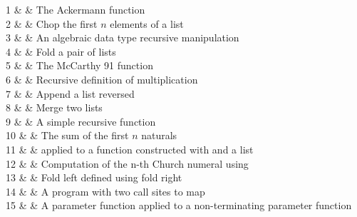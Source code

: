 1
& 
& The Ackermann function
\\ %

2
& 
& Chop the first $n$ elements of a list
\\ %

3
& 
&  An algebraic data type recursive  manipulation
\\ %

4
&  \hobenchmark
& Fold a pair of lists
\\ %

5
& 
& The McCarthy 91 function
\\ %

6
& 
& Recursive definition of multiplication
\\ %

7
& 
& Append a list reversed
\\ %

8
& 
& Merge two lists
\\ %

9
& 
& A simple recursive function
\\ %

10
& 
& The sum of the first $n$ naturals
\\ %


11
&  \hobenchmark
&  applied  to a function constructed with
 and a list
\\ %

12
&  \hobenchmark
& Computation of the n-th Church numeral using 
\\ %

13
&  \hobenchmark
& Fold left defined using fold right
\\ %

14
&  \hobenchmark
& A program with two call sites to map
\\ %

15
&  \hobenchmark
& A parameter function applied to a
non-terminating parameter function
\\ %

